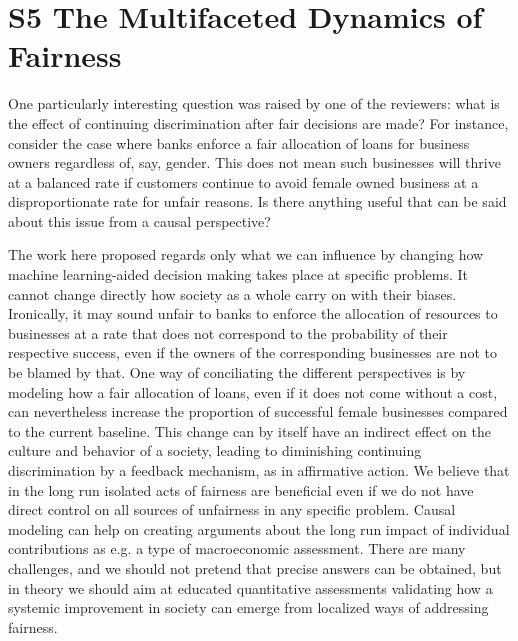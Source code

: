 
\section*{S5 The Multifaceted Dynamics of Fairness}
\label{sec:dynamics}

One particularly interesting question was raised by one of the
reviewers: what is the effect of continuing discrimination after fair
decisions are made?  For instance, consider the case where banks
enforce a fair allocation of loans for business owners regardless of,
say, gender. This does not mean such businesses will thrive at a
balanced rate if customers continue to avoid female owned business at
a disproportionate rate for unfair reasons. Is there anything useful
that can be said about this issue from a causal perspective?

The work here proposed regards only what we can influence by changing
how machine learning-aided decision making takes place at specific
problems. It cannot change directly how society as a whole carry on
with their biases. Ironically, it may sound unfair to banks to enforce
the allocation of resources to businesses at a rate that does not
correspond to the probability of their respective success, even if the
owners of the corresponding businesses are not to be blamed by
that. One way of conciliating the different perspectives is by
modeling how a fair allocation of loans, even if it does not come
without a cost, can nevertheless increase the proportion of successful
female businesses compared to the current baseline. This change can by
itself have an indirect effect on the culture and behavior of a
society, leading to diminishing continuing discrimination by a
feedback mechanism, as in affirmative action. We believe that in the
long run isolated acts of fairness are beneficial even if we do not
have direct control on all sources of unfairness in any specific
problem.  Causal modeling can help on creating arguments about the
long run impact of individual contributions as e.g. a type of
macroeconomic assessment. There are many challenges, and we should not
pretend that precise answers can be obtained, but in theory we should
aim at educated quantitative assessments validating how a systemic
improvement in society can emerge from localized ways of addressing
fairness.

